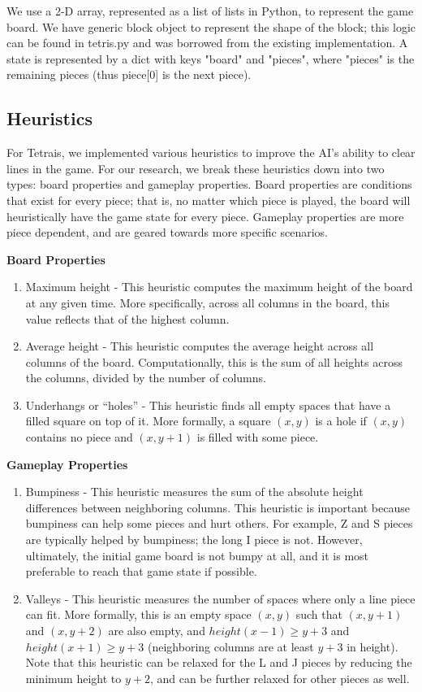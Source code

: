 \documentclass[12pt]{article}
\begin{document}
We use a 2-D array, represented as a list of lists in Python, to represent the game board. We have generic block object to represent the shape of the block; this logic can be found in tetris.py and was borrowed from the existing implementation. A state is represented by a dict with keys "board" and "pieces", where "pieces" is the remaining pieces (thus piece[0] is the next piece).

\subsection{Heuristics}

For Tetrais, we implemented various heuristics to improve the AI’s ability to clear lines in the game. For our research, we break these heuristics down into two types: board properties and gameplay properties. Board properties are conditions that exist for every piece; that is, no matter which piece is played, the board will heuristically have the game state for every piece. Gameplay properties are more piece dependent, and are geared towards more specific scenarios.

\textbf{Board Properties}
\begin{enumerate}
\item Maximum height - This heuristic computes the maximum height of the board at any given time. More specifically, across all columns in the board, this value reflects that of the highest column.
\item Average height - This heuristic computes the average height across all columns of the board. Computationally, this is the sum of all heights across the columns, divided by the number of columns.
\item Underhangs or ``holes'' - This heuristic finds all empty spaces that have a filled square on top of it. More formally, a square $(x,y)$ is a hole if $(x,y)$ contains no piece and $(x, y+1)$ is filled with some piece.
\end{enumerate}

\textbf{Gameplay Properties}
\begin{enumerate}
\item Bumpiness - This heuristic measures the sum of the absolute height differences between neighboring columns. This heuristic is important because bumpiness can help some pieces and hurt others. For example, Z and S pieces are typically helped by bumpiness; the long I piece is not. However, ultimately, the initial game board is not bumpy at all, and it is most preferable to reach that game state if possible.
\item Valleys - This heuristic measures the number of spaces where only a line piece can fit. More formally, this is an empty space $(x, y)$ such that $(x, y+1)$ and $(x, y+2)$ are also empty, and $height(x-1) \geq y+3$ and $height(x+1) \geq y+3$ (neighboring columns are at least $y+3$ in height). Note that this heuristic can be relaxed for the L and J pieces by reducing the minimum height to $y+2$, and can be further relaxed for other pieces as well.
\end{enumerate}
\end{document}
